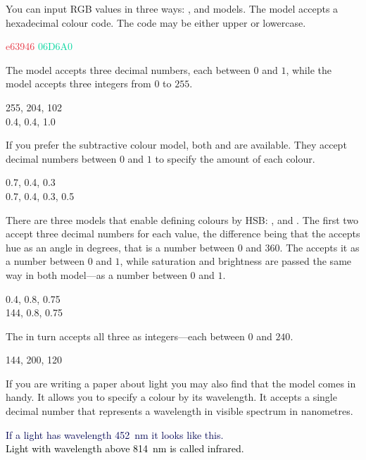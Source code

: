 You can input RGB values in three ways: ,  and
 models. The  model accepts a hexadecimal colour code.
The code may be either upper or lowercase.
\begin{example}
\textcolor[HTML]{e63946}{e63946}
\textcolor[HTML]{06D6A0}{06D6A0}
\end{example}
The  model accepts three decimal numbers, each between \(0\) and
\(1\), while the  model accepts three integers from \(0\) to \(255\).
\begin{example}
\textcolor[RGB]{255, 204, 102}{
  255, 204, 102
} \\
\textcolor[rgb]{0.4, 0.4, 1.0}{
  0.4, 0.4, 1.0
}
\end{example}

If you prefer the subtractive colour model, both  and  are
available. They accept decimal numbers between \(0\) and \(1\) to specify
the amount of each colour.
\begin{example}
\textcolor[cmy]{0.7, 0.4, 0.3}{
  0.7, 0.4, 0.3
} \\
\textcolor[cmyk]{
  0.7, 0.4, 0.3, 0.5
}{
  0.7, 0.4, 0.3, 0.5
}
\end{example}

There are three models that enable defining colours by HSB\@: ,
 and . The first two accept three decimal numbers for
each value, the difference being that the  accepts hue as an angle
in degrees, that is a number between \(0\) and \(360\). The  accepts
it as a number between \(0\) and \(1\), while saturation and brightness
are passed the same way in both model---as a number between \(0\) and \(1\).
\begin{example}
\textcolor[hsb]{
  0.4, 0.8, 0.75
}{
  0.4, 0.8, 0.75
}\\
\textcolor[Hsb]{
  144, 0.8, 0.75
}{
  144, 0.8, 0.75
}
\end{example}
The  in turn accepts all three as integers---each between \(0\) and
\(240\).
\begin{example}
\textcolor[HSB]{
  144, 200, 120
}{
  144, 200, 120
}
\end{example}

If you are writing a paper about light you may also find that the 
model comes in handy. It allows you to specify a colour by its wavelength. It
accepts a single decimal number that represents a wavelength in visible
spectrum in nanometres.
\begin{example}
\textcolor[wave]{452}{
  If a light has wavelength
  \qty{452}{\nm} it looks
  like this.  
} \\
\textcolor[wave]{700}{
  Light with wavelength above
  \qty{814}{\nm} is called
  infrared.
}
\end{example}

